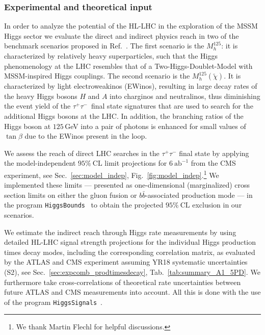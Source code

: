 \subsubsection*{Experimental and theoretical input}

In order to analyze the potential of the HL-LHC in the exploration of the MSSM Higgs sector we evaluate the direct and indirect physics reach in two of the benchmark scenarios proposed in Ref.~\cite{Bahl:2018zmf}. The first scenario is the $M_h^{125}$: it is characterized by relatively heavy superparticles, such that the Higgs phenomenology at the LHC resembles that of a Two-Higgs-Doublet-Model with MSSM-inspired Higgs couplings. The second scenario is the $M_h^{125}(\tilde{\chi})$. It is characterized by light electroweakinos (EWinos), resulting in large decay rates of the heavy Higgs bosons $H$ and $A$ into charginos and neutralinos, thus diminishing the event yield of the $\tau^+\tau^-$~final state signatures that are used to search
for the additional Higgs bosons at the LHC. In addition, the branching ratios of the Higgs boson at $125$\,GeV into a pair of photons is enhanced for small values of $\tan\beta$ due to the EWinos present in the loop.

We assess the reach of direct LHC searches in the  $\tau^+\tau^-$
final state by applying the model-independent $95\%~\mathrm{CL}$
limit projections for $6~\mathrm{ab}^{-1}$ from the CMS experiment, see Sec.~\ref{sec:model_indep}, Fig.~\ref{fig:model_indep}.\footnote{We thank Martin Flechl for helpful discussions.} 
We implemented these limits --- presented as one-dimensional (marginalized) cross section limits on either the
gluon fusion or $b\bar{b}$-associated production mode --- in the program
\texttt{HiggsBounds}~\cite{Bechtle:2008jh,Bechtle:2011sb,Bechtle:2013wla,Bechtle:2015pma} to obtain the projected $95\%~\mathrm{CL}$ exclusion in our scenarios.

We estimate the indirect reach through Higgs rate measurements by
using detailed HL-LHC signal strength projections for the individual
Higgs production times decay modes, including the corresponding
correlation matrix, as evaluated by the ATLAS and CMS experiment assuming YR18 systematic uncertainties (S2), see Sec.~\ref{sec:expcomb_prodtimesdecay}, Tab.~\ref{tab:summary_A1_5PD}.  We furthermore take cross-correlations of theoretical
rate uncertainties between future ATLAS and CMS measurements into
account. All this is done with the use of the program
\texttt{HiggsSignals}~\cite{Bechtle:2013xfa}. 

